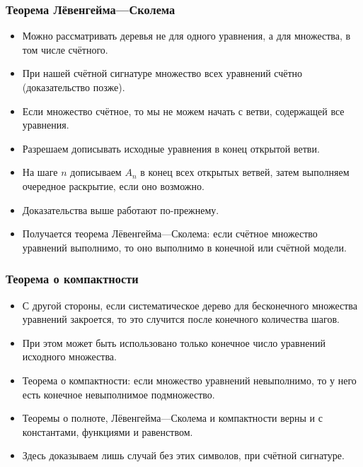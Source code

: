\documentclass[10pt]{beamer}
\begin{document}
\begin{frame}
    \frametitle{Теорема Лёвенгейма---Сколема}
    \begin{itemize}
        \item Можно рассматривать деревья не для одного уравнения, а для множества, в том числе счётного.
        \item При нашей счётной сигнатуре множество всех уравнений счётно (доказательство позже).
        \item Если множество счётное, то мы не можем начать с ветви, содержащей все уравнения.
        \item Разрешаем дописывать исходные уравнения в конец открытой ветви.
        \item На шаге $n$ дописываем $A_n$ в конец всех открытых ветвей, затем выполняем очередное раскрытие, если оно возможно.
        \item Доказательства выше работают по-прежнему.
        \item Получается теорема Лёвенгейма---Сколема: если счётное множество уравнений выполнимо, то оно выполнимо в конечной или счётной модели.
    \end{itemize}
\end{frame}

\begin{frame}
    \frametitle{Теорема о компактности}
    \begin{itemize}
        \item С другой стороны, если систематическое дерево для бесконечного множества уравнений закроется, то это случится после конечного количества шагов.
        \item При этом может быть использовано только конечное число уравнений исходного множества.
        \item Теорема о компактности: если множество уравнений невыполнимо, то у него есть конечное невыполнимое подмножество.
        \pause
        \item Теоремы о полноте, Лёвенгейма---Сколема и компактности верны и с константами, функциями и равенством.
        \item Здесь доказываем лишь случай без этих символов, при счётной сигнатуре.
    \end{itemize}
\end{frame}
\end{document}
